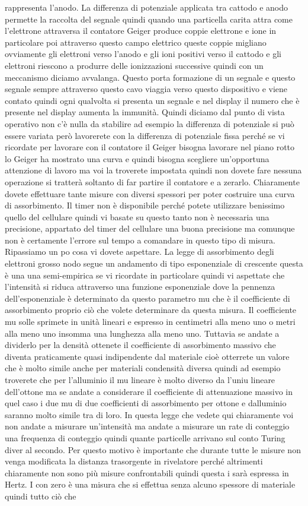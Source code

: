 rappresenta l'anodo. La differenza di potenziale applicata tra cattodo e anodo permette la raccolta del segnale quindi quando una particella carita attra come l'elettrone attraversa il contatore Geiger produce coppie elettrone e ione in particolare poi attraverso questo campo elettrico queste coppie migliano ovviamente gli elettroni verso l'anodo e gli ioni positivi verso il cattodo e gli elettroni riescono a produrre delle ionizzazioni successive quindi con un meccanismo diciamo avvalanga. Questo porta formazione di un segnale e questo segnale sempre attraverso questo cavo viaggia verso questo dispositivo e viene contato quindi ogni qualvolta si presenta un segnale e nel display il numero che è presente nel display aumenta la immunità. Quindi diciamo dal punto di vista operativo non c'è nulla da stabilire ad esempio la differenza di potenziale si può essere variata però lavorerete con la differenza di potenziale fissa perché se vi ricordate per lavorare con il contatore il Geiger bisogna lavorare nel piano rotto lo Geiger ha mostrato una curva e quindi bisogna scegliere un'opportuna attenzione di lavoro ma voi la troverete impostata quindi non dovete fare nessuna operazione si tratterà soltanto di far partire il contatore e a zerarlo. Chiaramente dovete effettuare tante misure con diversi spessori per poter costruire una curva di assorbimento. Il timer non è disponibile perché potete utilizzare benissimo quello del cellulare quindi vi basate su questo tanto non è necessaria una precisione, appartato del timer del cellulare una buona precisione ma comunque non è certamente l'errore sul tempo a comandare in questo tipo di misura. Ripassiamo un po cosa vi dovete aspettare. La legge di assorbimento degli elettroni grosso nodo segue un andamento di tipo esponenziale di crescente questa è una una semi-empirica se vi ricordate in particolare quindi vi aspettate che l'intensità si riduca attraverso una funzione esponenziale dove la pennenza dell'esponenziale è determinato da questo parametro mu che è il coefficiente di assorbimento proprio ciò che volete determinare da questa misura. Il coefficiente mu solle sprimete in unità lineari e espresso in centimetri alla meno uno o metri alla meno uno insomma una lunghezza alla meno uno. Tuttavia se andate a dividerlo per la densità ottenete il coefficiente di assorbimento massivo che diventa praticamente quasi indipendente dal materiale cioè otterrete un valore che è molto simile anche per materiali condensità diversa quindi ad esempio troverete che per l'alluminio il mu lineare è molto diverso da l'uniu lineare dell'ottone ma se andate a considerare il coefficiente di attenuazione massivo in quel caso i due mu di due coefficienti di assorbimento per ottone e dalluminio saranno molto simile tra di loro. In questa legge che vedete qui chiaramente voi non andate a misurare un'intensità ma andate a misurare un rate di conteggio una frequenza di conteggio quindi quante particelle arrivano sul conto Turing diver al secondo. Per questo motivo è importante che durante tutte le misure non venga modificata la distanza trasorgente in rivelatore perché altrimenti chiaramente non sono più misure confrontabili quindi questa i sarà espressa in Hertz. I con zero è una misura che si effettua senza alcuno spessore di materiale quindi tutto ciò che 
